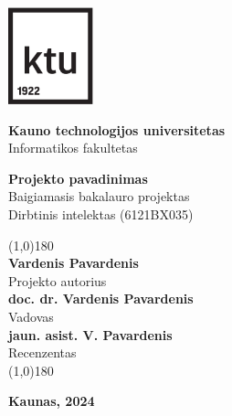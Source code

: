 \thispagestyle{noNumber}
\begin{center}
\includegraphics[width=2.46cm]{ktu.pdf}
\vspace{0.3cm}

\normalsize{\textbf{Kauno technologijos universitetas}} \\
Informatikos fakultetas

\vspace{5cm}

\Large \textbf{Projekto pavadinimas} \\
\large
Baigiamasis bakalauro projektas\\
\vspace{0.1cm}
Dirbtinis intelektas (6121BX035)
\vspace{3cm}
\begin{flushright}
\begin{minipage}{7cm}
{\color{lines_name} \line(1,0){180}}\\
\normalsize{\textbf{Vardenis Pavardenis}} \\
\normalsize{Projekto autorius}\bigskip \\ %
\normalsize{\textbf{doc. dr. Vardenis Pavardenis}} \\
\normalsize{Vadovas} \bigskip \\ 
\normalsize{\textbf{jaun. asist. V. Pavardenis}} \\
\normalsize{Recenzentas} \\
{\color{lines_name} \line(1,0){180}}\\
\end{minipage}
\end{flushright}
\vfill

\normalsize{\textbf{Kaunas, 2024}}
\end{center}
